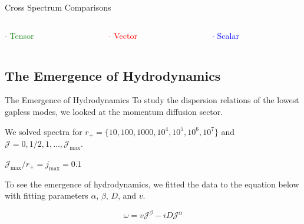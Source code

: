 \documentclass[xcolor=dvipsnames]{beamer}
\begin{document}
\begin{frame}{Cross Spectrum Comparisons}
  \vfill

  \begin{columns}[c]
    \begin{column}{0.33\textwidth}
      \textcolor{ForestGreen}{$\cdot$ Tensor}
    \end{column}

    \begin{column}{0.33\textwidth}
      \textcolor{red}{$\cdot$ Vector}
    \end{column}

    \begin{column}{0.33\textwidth}
      \textcolor{blue}{$\cdot$ Scalar}
    \end{column}
  \end{columns}
\end{frame}

\subsection{The Emergence of Hydrodynamics}

\begin{frame}{The Emergence of Hydrodynamics}
  To study the dispersion relations of the lowest gapless modes, we looked
  at the momentum diffusion sector.

  \vfill

  We solved spectra for
  \(r_+ = \{10, 100, 1000, 10^4 , 10^5 , 10^6 , 10^7 \}\) and
  \(\mathcal J = 0, 1/2, 1, \ldots, \mathcal J_\mathrm{max}\).

  \begin{alertblock}{}
    {\(\mathcal J_\mathrm{max}/r_+ = \mathit j_\mathrm{max} = 0.1\)}
  \end{alertblock}

  \vfill

  To see the emergence of hydrodynamics, we fitted the data to the
  equation below with fitting parameters \(\alpha\), \(\beta\), \(D\), and
  \(v\).

  \vfill

  \begin{equation}
    \omega = v \mathcal J^\beta - i D \mathcal J^\alpha
  \end{equation}
\end{frame}
\end{document}
